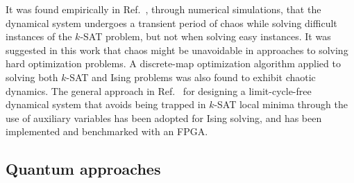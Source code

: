 \documentclass[fleqn,10pt]{wlscirep}
\begin{document}
It was found empirically in Ref.~\cite{ercsey2011optimization}, through numerical simulations, that the dynamical system undergoes a transient period of chaos while solving difficult instances of the $k$-SAT problem, but not when solving easy instances. It was suggested in this work that chaos might be unavoidable in approaches to solving hard optimization problems.
A discrete-map optimization algorithm\cite{elser2007searching} applied to solving both $k$-SAT and Ising problems was also found to exhibit chaotic dynamics.
The general approach in Ref.~\cite{ercsey2011optimization} for designing a limit-cycle-free dynamical system that avoids being trapped in $k$-SAT local minima through the use of auxiliary variables has been adopted for Ising solving\cite{leleu2019destabilization}, and has been implemented and benchmarked with an FPGA\cite{leleu2020chaotic}.



\subsection*{Quantum approaches}
\end{document}
